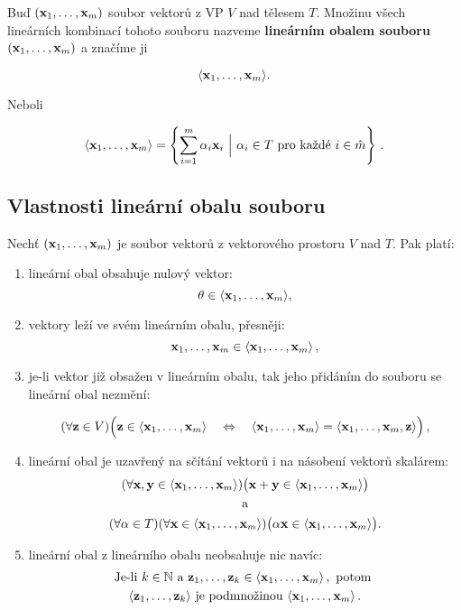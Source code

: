 Buď $(\mathbf{x}_{1},\dots,\mathbf{x}_{m})$ soubor vektorů z VP $V$ nad tělesem $T$. Množinu
všech lineárních kombinací tohoto souboru nazveme \textbf{lineárním obalem
      souboru} $(\mathbf{x}_{1},\dots,\mathbf{x}_{m})$ a značíme ji

\[ \langle  \mathbf{x}_{1},\dots,\mathbf{x}_{m}  \rangle . \]

\noindent Neboli

\[ \langle  \mathbf{x}_{1},\dots,\mathbf{x}_{m}  \rangle = \left\{\sum_{i=1}^m \alpha_i \mathbf{x}_i \ \Big|\ \alpha_i\in T \text{ pro každé }i \in \hat m \right\}\,. \]

\subsection*{Vlastnosti lineární obalu souboru}

Nechť $(\mathbf{x}_1,\ldots,\mathbf{x}_m)$ je soubor vektorů z vektorového prostoru $V$ nad
$T$. Pak platí:

\begin{enumerate}
      \item lineární obal obsahuje nulový vektor:
            \[ \theta\in \langle \mathbf{x}_1,\ldots,\mathbf{x}_m \rangle , \]
      \item vektory leží ve svém lineárním obalu, přesněji:
            \[ \mathbf{x}_1,\ldots,\mathbf{x}_m  \in  \langle \mathbf{x}_1,\ldots,\mathbf{x}_m \rangle\,, \]
      \item je-li vektor již obsažen v lineárním obalu, tak jeho přidáním do souboru se
            lineární obal nezmění:

            \[ (\forall \mathbf{z}\in V)\Big(\mathbf{z}\in\langle \mathbf{x}_1,\ldots,\mathbf{x}_m \rangle   \quad \Leftrightarrow \quad \langle  \mathbf{x}_1,\ldots,\mathbf{x}_m  \rangle =\langle  \mathbf{x}_1,\ldots,\mathbf{x}_m,\mathbf{z}  \rangle\Big)\,, \]

      \item lineární obal je uzavřený na sčítání vektorů i na násobení vektorů skalárem:
            \begin{gather*}
                  (\forall\mathbf{x},\mathbf{y}\in\langle  \mathbf{x}_1,\ldots,\mathbf{x}_m \rangle)\big(\mathbf{x}+\mathbf{y}\in\langle \mathbf{x}_1,\ldots,\mathbf{x}_m \rangle\big)\\
                  \quad\text{a}\quad\\
                  (\forall\alpha\in T)(\forall\mathbf{x}\in\langle \mathbf{x}_1,\ldots,\mathbf{x}_m \rangle)\big(\alpha \mathbf{x}\in\langle \mathbf{x}_1,\ldots,\mathbf{x}_m \rangle\big) .
            \end{gather*}
      \item lineární obal z lineárního obalu neobsahuje nic navíc:
            \begin{gather*}
                  \text{Je-li } k\in \mathbb{N} \text{ a } \mathbf{z}_1,\dots, \mathbf{z}_k\in\langle  \mathbf{x}_1,\ldots,\mathbf{x}_m \rangle\,,\text{ potom }\\
                  \langle  \mathbf{z}_1,\ldots,\mathbf{z}_k  \rangle \text{ je podmnožinou } \langle  \mathbf{x}_1,\ldots,\mathbf{x}_m \rangle\,.
            \end{gather*}
\end{enumerate}


